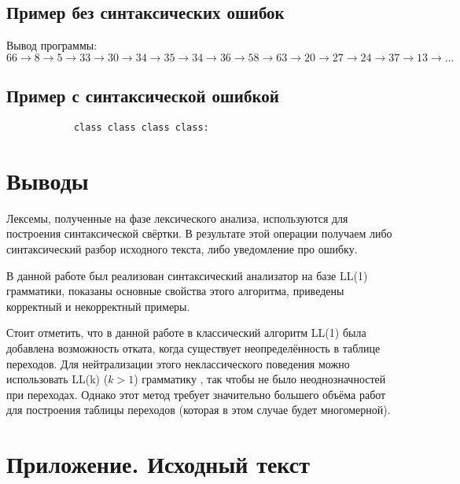 \documentclass[a4paper,10pt,notitlepage,pdftex]{scrreprt}
\begin{document}
    \section{Пример без синтаксических ошибок}
    \label{sec:ex1}
        
        Вывод программы:
        \[
            66 \rightarrow 8 \rightarrow 5 \rightarrow 33 \rightarrow 30 \rightarrow 34 \rightarrow 35 \rightarrow 34 \rightarrow 36 \rightarrow 58 \rightarrow 63 \rightarrow 20 \rightarrow 27 \rightarrow 24 \rightarrow 37 \rightarrow 13 \rightarrow \dots
        \]

    \section{Пример с синтаксической ошибкой}
    \label{sec:ex2}
        \begin{lstlisting}
            class class class class:
        \end{lstlisting}
\chapter{Выводы}
\label{chap:concl}
    Лексемы, полученные на фазе лексического анализа, используются для построения синтаксической свёртки.
    В результате этой операции получаем либо синтаксический разбор исходного текста, либо уведомление про ошибку.

    В данной работе был реализован синтаксический анализатор на базе LL(1) грамматики, показаны основные свойства
    этого алгоритма, приведены корректный и некорректный примеры.

    Стоит отметить, что в данной работе в классический алгоритм LL(1) была добавлена возможность отката, когда
    существует неопределённость в таблице переходов.
    Для нейтрализации этого неклассического поведения можно использовать LL(k) ($k > 1$) грамматику , так чтобы не
    было неоднозначностей при переходах.
    Однако этот метод требует значительно большего объёма работ для построения таблицы переходов (которая в этом
    случае будет многомерной).
\chapter*{Приложение. Исходный текст}
    \lstset{language=C++,basicstyle=\scriptsize}
    
\end{document}
